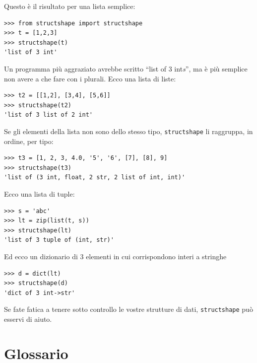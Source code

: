 \documentclass[10pt]{book}
\begin{document}
Questo è il risultato per una lista semplice:

\begin{verbatim}
>>> from structshape import structshape
>>> t = [1,2,3]
>>> structshape(t)
'list of 3 int'
\end{verbatim}
%
Un programma più aggraziato avrebbe scritto ``list of 3 int{\em s}'', ma è più semplice non avere a che fare con i plurali. Ecco una lista di liste:

\begin{verbatim}
>>> t2 = [[1,2], [3,4], [5,6]]
>>> structshape(t2)
'list of 3 list of 2 int'
\end{verbatim}
%
Se gli elementi della lista non sono dello stesso tipo,
{\tt structshape} li raggruppa, in ordine, per tipo:

\begin{verbatim}
>>> t3 = [1, 2, 3, 4.0, '5', '6', [7], [8], 9]
>>> structshape(t3)
'list of (3 int, float, 2 str, 2 list of int, int)'
\end{verbatim}
%
Ecco una lista di tuple:

\begin{verbatim}
>>> s = 'abc'
>>> lt = zip(list(t, s))
>>> structshape(lt)
'list of 3 tuple of (int, str)'
\end{verbatim}
%
Ed ecco un dizionario di 3 elementi in cui corrispondono interi a stringhe

\begin{verbatim}
>>> d = dict(lt) 
>>> structshape(d)
'dict of 3 int->str'
\end{verbatim}
%
Se fate fatica a tenere sotto controllo le vostre strutture di dati,
{\tt structshape} può esservi di aiuto.


\section{Glossario}
\end{document}
